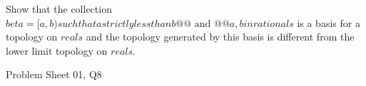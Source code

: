 \begin{samepage}
\begin{ex}
    Show that the collection $beta = {{ [a,b) such that a strictly less than b @@\text{ and }@@ a, b in rationals }}$ is a basis for a topology on $reals$ and the topology generated by this basis is different from the lower limit topology on $reals$.
\end{ex}
\begin{source}
Problem Sheet 01, Q8
\end{source}
\end{samepage}
